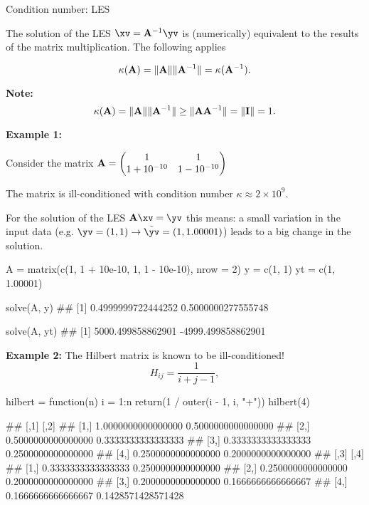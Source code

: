 \begin{vbframe}{Condition number: LES}

The solution of the LES $\xv = \Amat^{-1}\yv$ is (numerically) equivalent to the results of the matrix multiplication. The following applies

$$
\kappa(\mathbf{A}) = \|\mathbf{A}\|\|\mathbf{A}^{-1}\| = \kappa(\mathbf{A}^{-1}).
$$

\textbf{Note:}
$$
\kappa(\mathbf{A}) = \|\mathbf{A}\|\|\mathbf{A}^{-1}\| \geq \|\mathbf{A}\mathbf{A}^{-1}\| = \| \mathbf{I} \| = 1.
$$

\lz
\textbf{Example 1:}

Consider the matrix $\mathbf{A} = \begin{pmatrix} 1 & 1 \\1 + 10^{-10} & 1 - 10^{-10} \end{pmatrix}$
\lz

The matrix is ill-conditioned with condition number $\kappa \approx 2 \times 10^9$.

For the solution of the LES $\Amat \xv = \yv$ this means: a small variation in the input data (e.g. $\yv=(1, 1) \to \tilde \yv = (1, 1.00001)$) leads to a big change in the solution.
\lz
\lz
\footnotesize
\begin{verbbox}
A = matrix(c(1, 1 + 10e-10, 1, 1 - 10e-10), nrow = 2)
y = c(1, 1)
yt = c(1, 1.00001)
\end{verbbox}
\col
\vspace{0.1cm}

\begin{verbbox}
solve(A, y)
## [1] 0.4999999722444252 0.5000000277555748
\end{verbbox}
\col
\vspace{0.1cm}

\begin{verbbox}
solve(A, yt)
## [1] 5000.499858862901 -4999.499858862901
\end{verbbox}
\col

\normalsize

\framebreak

\textbf{Example 2:} The Hilbert matrix is known to be ill-conditioned!
$$
H_{ij} = \frac{1}{i + j - 1},
$$
\footnotesize
\begin{verbbox}
hilbert = function(n) {
  i = 1:n 
  return(1 / outer(i - 1, i, "+"))
}
hilbert(4)
\end{verbbox}
\col
\vspace{0.2cm}
\begin{verbbox}
##                    [,1]               [,2]
## [1,] 1.0000000000000000 0.5000000000000000
## [2,] 0.5000000000000000 0.3333333333333333
## [3,] 0.3333333333333333 0.2500000000000000
## [4,] 0.2500000000000000 0.2000000000000000
##                    [,3]               [,4]
## [1,] 0.3333333333333333 0.2500000000000000
## [2,] 0.2500000000000000 0.2000000000000000
## [3,] 0.2000000000000000 0.1666666666666667
## [4,] 0.1666666666666667 0.1428571428571428
\end{verbbox}
\col
\framebreak


\end{vbframe}
